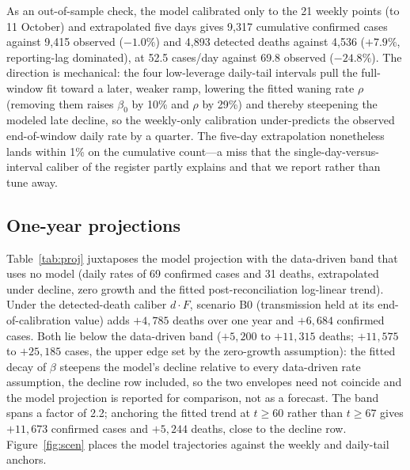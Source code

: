 \documentclass[10pt]{plos}
\begin{document}
As an out-of-sample check, the model calibrated only to the 21 weekly
points (to 11 October) and extrapolated five days gives 9{,}317
cumulative confirmed cases against 9,415 observed ($-1.0\%$) and 4{,}893
detected deaths against 4,536 ($+7.9\%$, reporting-lag dominated), at
52.5 cases/day against 69.8 observed ($-24.8\%$). The direction is
mechanical: the four low-leverage daily-tail intervals pull the
full-window fit toward a later, weaker ramp, lowering the fitted waning
rate $\rho$ (removing them raises $\beta_0$ by 10\% and $\rho$ by 29\%)
and thereby steepening the modeled late decline, so the weekly-only
calibration under-predicts the observed end-of-window daily rate by a
quarter. The five-day extrapolation nonetheless lands within 1\% on the
cumulative count---a miss that the single-day-versus-interval caliber of
the register partly explains and that we report rather than tune away.
\subsection{One-year projections}\label{sec:scenarios}

Table~\ref{tab:proj} juxtaposes the model projection with the
data-driven band that uses no model (daily rates of 69 confirmed cases
and 31 deaths, extrapolated under decline, zero growth and the fitted
post-reconciliation log-linear trend). Under the detected-death caliber
$d\cdot F$, scenario B0 (transmission held at its end-of-calibration
value) adds $+4{,}785$ deaths over one year and $+6{,}684$ confirmed
cases. Both lie below the data-driven band ($+5{,}200$ to $+11{,}315$
deaths; $+11{,}575$ to $+25{,}185$ cases, the upper edge set by the
zero-growth assumption): the fitted decay of $\beta$
steepens the model's decline relative to every data-driven rate
assumption, the decline row included, so the two envelopes need not
coincide and the model projection is reported for comparison, not as a
forecast. The band spans a factor of 2.2; anchoring the fitted trend at
$t\ge60$ rather than $t\ge67$ gives $+11{,}673$ confirmed cases and
$+5{,}244$ deaths, close to the decline row. Figure~\ref{fig:scen} places the
model trajectories against the weekly and daily-tail anchors.
\end{document}
